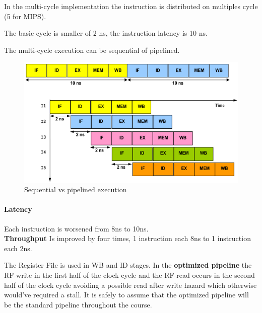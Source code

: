 In the multi-cycle implementation the instruction is distributed on multiples cycle (5 for MIPS).

The basic cycle is smaller of 2 ns, the instruction latency is 10 ns.

The multi-cycle execution can be sequential of pipelined.
\begin{figure}[h]
    \centering
    \includegraphics[scale=0.4]{images/sequential-vs-pipelined}
    \caption{Sequential vs pipelined execution}
    \label{fig:sequential-vs-sequential}
\end{figure}

\paragraph{Latency} Each instruction is worsened from 8ns to 10ns.\\
\textbf{Throughput} Is improved by four times, 1 instruction each 8ns to 1 instruction each 2ns.


The Register File is used in WB and ID stages.
In the \textbf{optimized pipeline} the RF-write in the first half of the clock cycle and the RF-read occurs in the
second half of the clock cycle avoiding a possible read after write hazard which otherwise would've required a stall.
It is safely to assume that the optimized pipeline will be the standard pipeline throughout the course.